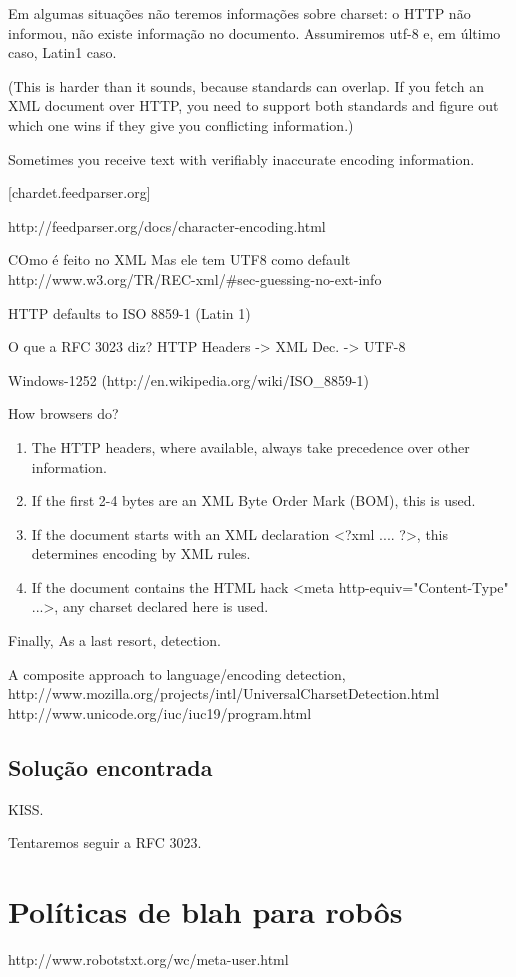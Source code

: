 Em algumas situações não teremos informações sobre charset: o HTTP não
informou, não existe informação no documento. Assumiremos utf-8 e, em
último caso, Latin1 caso.

    (This is harder than it sounds, because standards can overlap. If
    you fetch an XML document over HTTP, you need to support both
    standards and figure out which one wins if they give you conflicting
    information.)
    
    Sometimes you receive text with verifiably inaccurate encoding information.
    
    [chardet.feedparser.org]


http://feedparser.org/docs/character-encoding.html

    COmo é feito no XML
        Mas ele tem UTF8 como default
        http://www.w3.org/TR/REC-xml/#sec-guessing-no-ext-info

    HTTP defaults to ISO 8859-1 (Latin 1)

    O que a RFC 3023 diz? HTTP  Headers -> XML Dec. -> UTF-8


Windows-1252 (http://en.wikipedia.org/wiki/ISO_8859-1)

How browsers do?

\begin{enumerate}
\item The HTTP headers, where available, always take precedence over other information.
\item  If the first 2-4 bytes are an XML Byte Order Mark (BOM), this is used.
\item  If the document starts with an XML declaration <?xml .... ?>, this determines encoding by XML rules.
 \item If the document contains the HTML hack <meta http-equiv="Content-Type" ...>, any charset declared here is used.
\end{enumerate}

Finally, As a last resort, detection.

A composite approach to language/encoding detection,
    http://www.mozilla.org/projects/intl/UniversalCharsetDetection.html
    http://www.unicode.org/iuc/iuc19/program.html

\subsection{Solução encontrada}

KISS.

Tentaremos seguir a RFC 3023.
\section{Políticas de blah para robôs}
http://www.robotstxt.org/wc/meta-user.html
